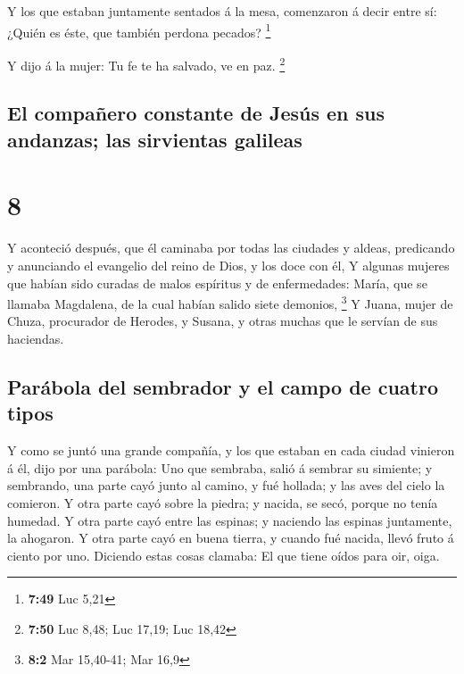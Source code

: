  Y los que estaban juntamente sentados á la mesa,
comenzaron á decir entre sí: ¿Quién es éste, que también perdona
pecados? \footnote{\textbf{7:49} Luc 5,21}

 Y dijo á la mujer: Tu fe te ha salvado, ve en paz.
\footnote{\textbf{7:50} Luc 8,48; Luc 17,19; Luc 18,42}

\hypertarget{el-compauxf1ero-constante-de-jesuxfas-en-sus-andanzas-las-sirvientas-galileas}{%
\subsection{El compañero constante de Jesús en sus andanzas; las
sirvientas
galileas}\label{el-compauxf1ero-constante-de-jesuxfas-en-sus-andanzas-las-sirvientas-galileas}}

\hypertarget{section-7}{%
\section{8}\label{section-7}}

 Y aconteció después, que él caminaba por todas las ciudades
y aldeas, predicando y anunciando el evangelio del reino de Dios, y los
doce con él,  Y algunas mujeres que habían sido curadas de
malos espíritus y de enfermedades: María, que se llamaba Magdalena, de
la cual habían salido siete demonios, \footnote{\textbf{8:2} Mar
  15,40-41; Mar 16,9}  Y Juana, mujer de Chuza, procurador
de Herodes, y Susana, y otras muchas que le servían de sus haciendas.

\hypertarget{paruxe1bola-del-sembrador-y-el-campo-de-cuatro-tipos}{%
\subsection{Parábola del sembrador y el campo de cuatro
tipos}\label{paruxe1bola-del-sembrador-y-el-campo-de-cuatro-tipos}}

 Y como se juntó una grande compañía, y los que estaban en
cada ciudad vinieron á él, dijo por una parábola:  Uno que
sembraba, salió á sembrar su simiente; y sembrando, una parte cayó junto
al camino, y fué hollada; y las aves del cielo la comieron. 
Y otra parte cayó sobre la piedra; y nacida, se secó, porque no tenía
humedad.  Y otra parte cayó entre las espinas; y naciendo
las espinas juntamente, la ahogaron.  Y otra parte cayó en
buena tierra, y cuando fué nacida, llevó fruto á ciento por uno.
Diciendo estas cosas clamaba: El que tiene oídos para oir, oiga.

